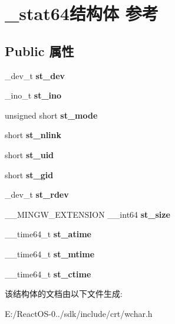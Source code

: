 \hypertarget{struct__stat64}{}\section{\+\_\+stat64结构体 参考}
\label{struct__stat64}
\subsection*{Public 属性}
\begin{DoxyCompactItemize}
\item 
\mbox{\label{struct__stat64_a9d249ab684293fd76e1509b492d844ca}} 
\+\_\+dev\+\_\+t {\bfseries st\+\_\+dev}
\item 
\mbox{\label{struct__stat64_af813bdc86a6a84f1b4ddaa49b94fcae1}} 
\+\_\+ino\+\_\+t {\bfseries st\+\_\+ino}
\item 
\mbox{\label{struct__stat64_ab2e0205aafd205fb5dabef9ee5d3e82e}} 
unsigned short {\bfseries st\+\_\+mode}
\item 
\mbox{\label{struct__stat64_adef6d34064ecaaf874a03bfb56435b40}} 
short {\bfseries st\+\_\+nlink}
\item 
\mbox{\label{struct__stat64_a6ac4b532ef242e427f900c2d71e830cb}} 
short {\bfseries st\+\_\+uid}
\item 
\mbox{\label{struct__stat64_aa156be9dd8ad089b8ba71ee6f9d0fec0}} 
short {\bfseries st\+\_\+gid}
\item 
\mbox{\label{struct__stat64_ae14982bc9f276a8b8f5169fab8f0ceeb}} 
\+\_\+dev\+\_\+t {\bfseries st\+\_\+rdev}
\item 
\mbox{\label{struct__stat64_a829cd3dac2cc14b8a392652669f7a6cf}} 
\+\_\+\+\_\+\+M\+I\+N\+G\+W\+\_\+\+E\+X\+T\+E\+N\+S\+I\+ON \+\_\+\+\_\+int64 {\bfseries st\+\_\+size}
\item 
\mbox{\label{struct__stat64_a8ebdf5016894d0238016658adc1004a0}} 
\+\_\+\+\_\+time64\+\_\+t {\bfseries st\+\_\+atime}
\item 
\mbox{\label{struct__stat64_a67e3f234f01fa5732edc0243598d4f09}} 
\+\_\+\+\_\+time64\+\_\+t {\bfseries st\+\_\+mtime}
\item 
\mbox{\label{struct__stat64_a3f94e4f728b64cc833d118a1000bbbe9}} 
\+\_\+\+\_\+time64\+\_\+t {\bfseries st\+\_\+ctime}
\end{DoxyCompactItemize}


该结构体的文档由以下文件生成\+:\begin{DoxyCompactItemize}
\item 
E\+:/\+React\+O\+S-\/0../sdk/include/crt/wchar.\+h\end{DoxyCompactItemize}
